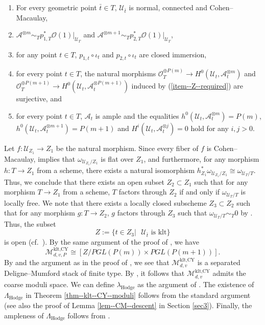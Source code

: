 \documentclass[12pt,twoside]{amsart}
\theoremstyle{definition}
\begin{document}
\begin{enumerate}
    \item For every geometric point $\bar{t}\in T$, $\mathcal{U}_{\bar{t}}$ is normal, connected and Cohen--Macaulay,
    \item \label{item--Z--required}$\mathcal{A}^{\otimes m}\sim_Tp_{1,T}^*\mathcal{O}(1)|_{\mathcal{U}_T}$ and $\mathcal{A}^{\otimes m+1}\sim_Tp_{2,T}^*\mathcal{O}(1)|_{\mathcal{U}_T}$,
    \item for any point $t\in T$, $p_{1,t}\circ\iota_t$ and $p_{2,t}\circ\iota_t$ are closed immersion,
    \item for every point $t\in T$, the natural morphisms $\mathcal{O}_{T}^{\oplus  P(m)}\to H^0(\mathcal{U}_t,\mathcal{A}^{\otimes m}_{t})$ and $\mathcal{O}_{T}^{\oplus P(m+1)}\to H^0(\mathcal{U}_t,\mathcal{A}^{\otimes P(m+1)}_{t})$ induced by (\ref{item--Z--required}) are surjective, and
    \item for every point $t\in T$, $\mathcal{A}_t$ is ample and the equalities $h^0(\mathcal{U}_t,\mathcal{A}^{\otimes m}_{t})=P(m)$, $h^0(\mathcal{U}_t,\mathcal{A}^{\otimes m+1}_{t})=P(m+1)$ and $H^i(\mathcal{U}_t,\mathcal{A}^{\otimes j}_{t})=0$ hold for any $i,j>0$.
\end{enumerate} 
Let $f\colon \mathcal{U}_{Z_1}\to Z_1$ be the natural morphism.
Since every fiber of $f$ is Cohen--Macaulay, \cite[2.68.5]{kollar-moduli} implies that $\omega_{\mathcal{U}_{Z_1}/Z_1}$ is flat over $Z_1$, and furthermore, for any morphism $h\colon T\to Z_1$ from a scheme, there exists a natural isomorphism $h_{Z_1}^*\omega_{\mathcal{U}_{Z_1}/Z_1}\cong \omega_{\mathcal{U}_{T}/T}$.
Thus, we conclude that there exists an open subset $Z_2\subset Z_1$ such that for any morphism $T\to Z_1$ from a scheme, $T$ factors through $Z_2$ if and only if $\omega_{\mathcal{U}_{T}/T}$ is locally free. 
We note that there exists a locally closed subscheme $Z_3\subset Z_2$ such that for any morphism $g\colon T\to Z_2$, $g$ factors through $Z_3$ such that $\omega_{\mathcal{U}_T/T}\sim_T0$ by \cite[Proposition 9.42]{kollar-moduli}.
Thus, the subset
\[
Z:=\{t\in Z_3| \text{ $\mathcal{U}_{\bar{t}}$ is klt}\}
\]
is open (cf.~\cite[Corollary 4.10]{kollar-mmp}).
By the same argument of the proof of \cite[Theorem 5.1, Proposition 5.6]{HH}, we have
\[
\mathcal{M}^{\textrm{klt,CY}}_{d,v,P}\cong [Z/PGL(P(m))\times PGL(P(m+1))].
\]
By \cite[Theorem 4.2]{O2} and the argument as in the proof of \cite[Theorem 5.1]{HH}, we see that $\mathcal{M}^{\textrm{klt,CY}}_{d,v}$ is a separated Deligne--Mumford stack of finite type.
By \cite{KeM}, it follows that $\mathcal{M}^{\textrm{klt,CY}}_{d,v}$ admits the coarse moduli space. 
We can define $\lambda_{\mathrm{Hodge}}$ as the argument of \cite[Subsection 3.2]{Hat23}.
The existence of $\Lambda_{\mathrm{Hodge}}$ in Theorem \ref{thm--klt--CY--moduli} follows from the standard argument (see also the proof of Lemma \ref{lem--CM--descent} in Section \ref{sec3}).
Finally, the ampleness of $\Lambda_{\mathrm{Hodge}}$ follows from \cite[Theorem 8.23]{viehweg95}.
\end{document}
